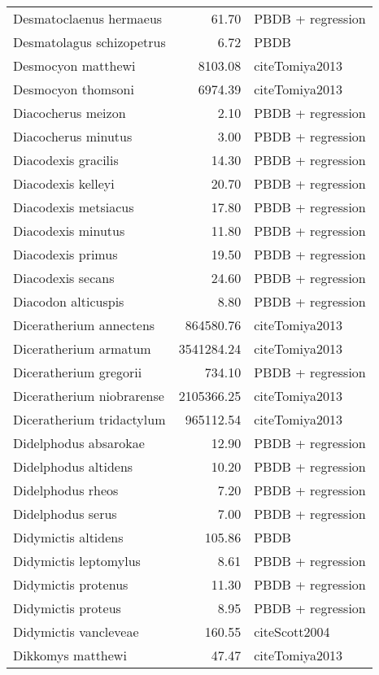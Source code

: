 \begin{table}[ht]
\begin{tabular}{lrl}
  Desmatoclaenus hermaeus & 61.70 & PBDB + regression \\ 
  Desmatolagus schizopetrus & 6.72 & PBDB \\ 
  Desmocyon matthewi & 8103.08 & cite{Tomiya2013} \\ 
  Desmocyon thomsoni & 6974.39 & cite{Tomiya2013} \\ 
  Diacocherus meizon & 2.10 & PBDB + regression \\ 
  Diacocherus minutus & 3.00 & PBDB + regression \\ 
  Diacodexis gracilis & 14.30 & PBDB + regression \\ 
  Diacodexis kelleyi & 20.70 & PBDB + regression \\ 
  Diacodexis metsiacus & 17.80 & PBDB + regression \\ 
  Diacodexis minutus & 11.80 & PBDB + regression \\ 
  Diacodexis primus & 19.50 & PBDB + regression \\ 
  Diacodexis secans & 24.60 & PBDB + regression \\ 
  Diacodon alticuspis & 8.80 & PBDB + regression \\ 
  Diceratherium annectens & 864580.76 & cite{Tomiya2013} \\ 
  Diceratherium armatum & 3541284.24 & cite{Tomiya2013} \\ 
  Diceratherium gregorii & 734.10 & PBDB + regression \\ 
  Diceratherium niobrarense & 2105366.25 & cite{Tomiya2013} \\ 
  Diceratherium tridactylum & 965112.54 & cite{Tomiya2013} \\ 
  Didelphodus absarokae & 12.90 & PBDB + regression \\ 
  Didelphodus altidens & 10.20 & PBDB + regression \\ 
  Didelphodus rheos & 7.20 & PBDB + regression \\ 
  Didelphodus serus & 7.00 & PBDB + regression \\ 
  Didymictis altidens & 105.86 & PBDB \\ 
  Didymictis leptomylus & 8.61 & PBDB + regression \\ 
  Didymictis protenus & 11.30 & PBDB + regression \\ 
  Didymictis proteus & 8.95 & PBDB + regression \\ 
  Didymictis vancleveae & 160.55 & cite{Scott2004} \\ 
  Dikkomys matthewi & 47.47 & cite{Tomiya2013} \\ 

\end{tabular}
\end{table}
